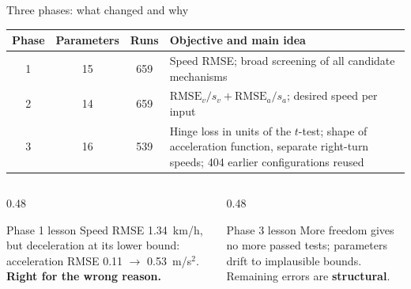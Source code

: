 \documentclass[aspectratio=169,10pt]{beamer}
\newcommand{\hl}[1]{\textcolor{accent}{\textbf{#1}}}
\begin{document}
\begin{frame}{Three phases: what changed and why}
\small
\begin{tabularx}{\textwidth}{cccX}
\toprule
\textbf{Phase} & \textbf{Parameters} & \textbf{Runs} & \textbf{Objective and main idea}\\
\midrule
1 & 15 & 659 & Speed RMSE; broad screening of all candidate mechanisms\\
2 & 14 & 659 & $\mathrm{RMSE}_v/s_v + \mathrm{RMSE}_a/s_a$; desired speed per input\\
3 & 16 & 539 & Hinge loss in units of the $t$-test; shape of acceleration function, separate
right-turn speeds; 404 earlier configurations reused\\
\bottomrule
\end{tabularx}
\vspace{10pt}
\begin{columns}[T]
\begin{column}{0.48\textwidth}
\begin{block}{Phase 1 lesson}
Speed RMSE 1.34~km/h, but deceleration at its lower bound: acceleration RMSE 0.11 $\rightarrow$
0.53~m/s$^2$. \hl{Right for the wrong reason.}
\end{block}
\end{column}
\begin{column}{0.48\textwidth}
\begin{block}{Phase 3 lesson}
More freedom gives no more passed tests; parameters drift to implausible bounds. Remaining errors are
\hl{structural}.
\end{block}
\end{column}
\end{columns}
\end{frame}
\end{document}
